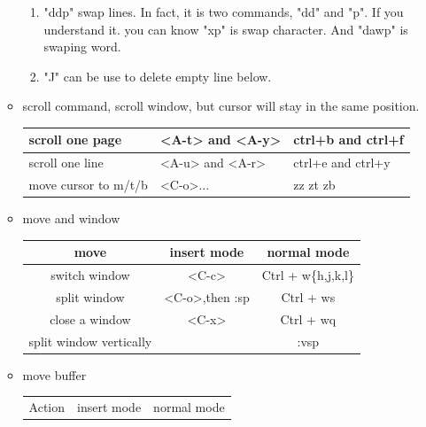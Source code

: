 \documentclass[a4paper,12pt,twoside]{book}
\begin{document}
\begin{itemize}
\begin{itemize}
\begin{enumerate}
			\item "ddp" swap lines. In fact, it is two commands, "dd" and "p". If you understand it. you can know "xp" is swap character. And "dawp" is swaping word.

			\item "J" can be use to delete empty line below.
	\end{enumerate}

\item scroll command, scroll window, but cursor will stay in the same position.
		\begin{center}
 \begin{tabular}{p{}|p{}|p{}}
        \hline
        scroll one  page &  <A-t> and <A-y>  & ctrl+b and  ctrl+f    \\
        
        \hline 		  
        scroll one line &  <A-u> and <A-r>  & ctrl+e and ctrl+y \\
        
         \hline 		  
        move cursor to m/t/b & <C-o>...    & zz zt zb \\

    \end{tabular}
\end{center}
 
\item move and window

\begin{center}
   
  \begin{tabular}{c|c|c}
   \hline
		move & insert mode & normal mode \\
		
\hline 
		switch window & <C-c> &  Ctrl + w\{h,j,k,l\}\\
				
		\hline 
		split window & <C-o>,then :sp  &  Ctrl + ws\\
		
		\hline 
		close a window & <C-x> & Ctrl + wq\\
		
		\hline
		split window vertically	&   & :vsp \\ 

			\end{tabular}
	\end{center}

\item move  buffer

\begin{center}
\begin{tabular}{p{}|p{}|p{}}
   \hline
		Action & insert mode & normal mode \\
		

\end{tabular}
\end{center}
\end{itemize}
\end{itemize}
\end{document}
